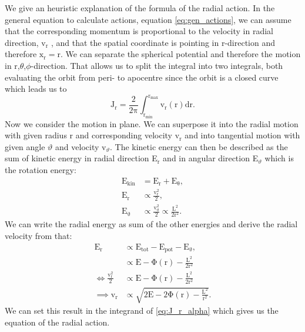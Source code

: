 \par We give an heuristic explanation of the formula of the radial action. In the general equation to calculate actions, equation \eqref{eq:gen_actions}, we can assume that the corresponding momentum is proportional to the velocity in radial direction, v\(_\mathrm{r}\) , and that the spatial coordinate is pointing in r-direction and therefore \(\mathrm{x_r=r}\). We can separate the spherical potential and therefore the motion in r,\(\theta\),\(\phi\)-direction. That allows us to split the integral into two integrals, both evaluating the orbit from peri- to apocentre since the orbit is a closed curve which leads us to 
\begin{equation}\label{eq:J_r_alpha}
\mathrm{J_r=\frac{2}{2\pi}\int_{r_{min}}^{r_{max}}v_r(r)dr}.
\end{equation}
Now we consider the motion in plane. We can superpose it into the radial motion with given radius r and corresponding velocity v\(_\mathrm{r}\) and into tangential motion with given angle \(\vartheta\) and velocity v\(_\vartheta\). The kinetic energy can then be described as the sum of kinetic energy in radial direction E\(_\mathrm{r}\) and in angular direction E\(_\vartheta\) which is the rotation energy: 
\begin{align}
\mathrm{E_{kin} }&=\mathrm{E_r+E_\theta},\\\mathrm{  E_r} & \propto \mathrm{ \frac{v_r^2}{2} },\\\mathrm{ E_\vartheta} & \propto \mathrm{ \frac{v_\vartheta^2}{2}\propto \frac{L^2}{2r^2}}. 
\end{align}
We can write the radial energy as sum of the other energies and derive the radial velocity from that:
\begin{align*}
\mathrm{E_r }& \propto \mathrm{ E_{tot}-E_{pot}-E_\vartheta},\\
& \propto \mathrm{ E- \Phi(r)-\frac{L^2}{2r^2}}\\
\Leftrightarrow \mathrm{\frac{v_r^2}{2} } & \propto \mathrm{ E-\Phi(r)-\frac{L^2}{2r^2}}\\
\implies \mathrm{v_r} & \propto \mathrm{ \sqrt{2E-2\Phi(r)-\frac{L^2}{r^2}}}.
\end{align*}
We can set this result in the integrand of \eqref{eq:J_r_alpha} which gives us the equation of the radial action. 
